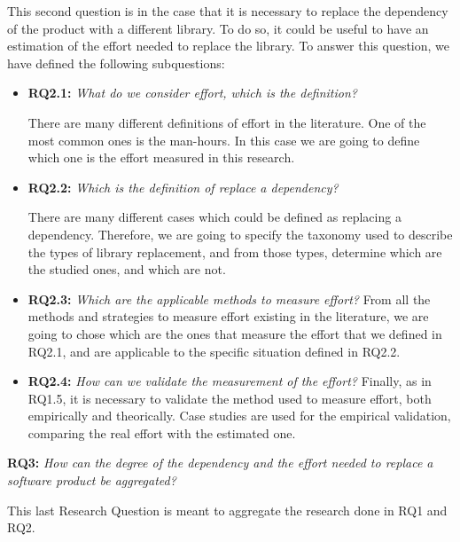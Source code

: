 This second question is in the case that it is necessary to replace the dependency of the product with a different library. To do so, it could be useful to have an estimation of the effort needed to replace the library. To answer this question, we have defined the following subquestions:

\begin{itemize}
  \item \textbf{RQ2.1:} \textit{What do we consider effort, which is the definition?}

  There are many different definitions of effort in the literature. One of the most common ones is the man-hours. In this case we are going to define which one is the effort measured in this research.
  \blankl

  \item \textbf{RQ2.2:} \textit{Which is the definition of replace a dependency?}

  There are many different cases which could be defined as replacing a dependency. Therefore, we are going to specify the taxonomy used to describe the types of library replacement, and from those types, determine which are the studied ones, and which are not.
  \blankl

  \item \textbf{RQ2.3:} \textit{Which are the applicable methods to measure effort?}
  From all the methods and strategies to measure effort existing in the literature, we are going to chose which are the ones that measure the effort that we defined in RQ2.1, and are applicable to the specific situation defined in RQ2.2.
  \blankl

  \item \textbf{RQ2.4:} \textit{How can we validate the measurement of the effort?}
  Finally, as in RQ1.5, it is necessary to validate the method used to measure effort, both empirically and theorically. Case studies are used for the empirical validation, comparing the real effort with the estimated one.
\end{itemize}

\blankl
\textbf{RQ3:} \textit{How can the degree of the dependency and the effort needed to replace a software product be aggregated?}

This last Research Question is meant to aggregate the research done in RQ1 and RQ2.

